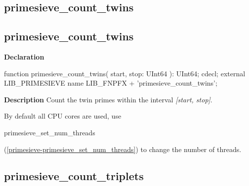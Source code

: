\documentclass{report}
\newif\ifpdf
\begin{document}
\subsection*{\large{\textbf{primesieve{\_}count{\_}twins}}\normalsize\hspace{1ex}\hrulefill}
\else
\subsection*{primesieve{\_}count{\_}twins}
\fi
\label{primesieve-primesieve_count_twins}
\begin{list}{}{
\setlength{\itemindent}{0cm}
\setlength{\listparindent}{0cm}
\setlength{\leftmargin}{\evensidemargin}
\addtolength{\leftmargin}{\tmplength}
\settowidth{\labelsep}{X}
\addtolength{\leftmargin}{\labelsep}
\setlength{\labelwidth}{\tmplength}
}
\item[\textbf{Declaration}\hfill]
\ifpdf
\begin{flushleft}
\fi
\begin{ttfamily}
function primesieve{\_}count{\_}twins( start, stop: UInt64 ): UInt64; cdecl; external LIB{\_}PRIMESIEVE name LIB{\_}FNPFX + 'primesieve{\_}count{\_}twins';\end{ttfamily}

\ifpdf
\end{flushleft}
\fi

\par
\item[\textbf{Description}]
Count the twin primes within the interval \textit{[start, stop]}.

By default all CPU cores are used, use \begin{ttfamily}primesieve{\_}set{\_}num{\_}threads\end{ttfamily}(\ref{primesieve-primesieve_set_num_threads}) to change the number of threads.

\end{list}
\ifpdf
\subsection*{\large{\textbf{primesieve{\_}count{\_}triplets}}\normalsize\hspace{1ex}\hrulefill}
\else
\end{document}
